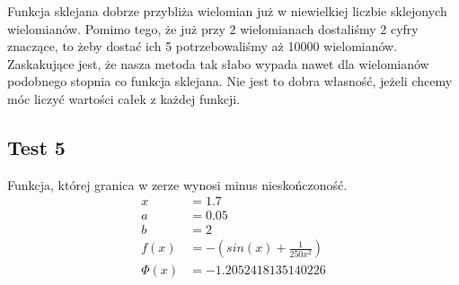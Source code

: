 \documentclass[a4paper]{article}
\begin{document}
    \begin{figure}[!htbp]
        \hfill
        \hfill
        \hfill
    \end{figure}
    
   Funkcja sklejana dobrze przybliża wielomian już w niewielkiej liczbie sklejonych wielomianów. Pomimo tego, że już przy 2 wielomianach
   dostaliśmy 2 cyfry znaczące, to żeby dostać ich 5 potrzebowaliśmy aż 10000 wielomianów. Zaskakujące jest, że nasza metoda tak słabo wypada
   nawet dla wielomianów podobnego stopnia co funkcja sklejana. Nie jest to dobra własność, jeżeli chcemy móc liczyć wartości całek z każdej funkcji.  

\newpage
\subsection{Test 5}
    Funkcja, której granica w zerze wynosi minus nieskończoność.
    \[
        \begin{aligned}
            x &= 1.7 \\
            a & = 0.05 \\
            b &= 2 \\
            f(x) &= -(sin(x) + \frac{1}{250x^2}) \\
            \Phi(x) &= -1.2052418135140226
        \end{aligned}
    \]
\end{document}
